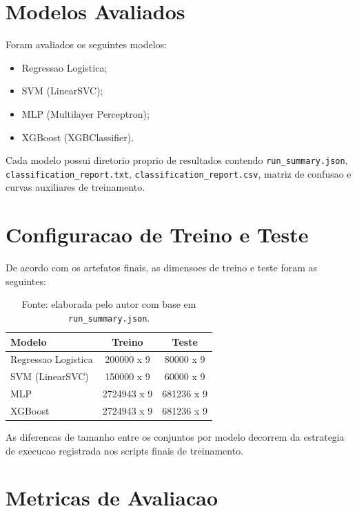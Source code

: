 \section{Modelos Avaliados}

Foram avaliados os seguintes modelos:

\begin{itemize}
  \item Regressao Logistica;
  \item SVM (LinearSVC);
  \item MLP (Multilayer Perceptron);
  \item XGBoost (XGBClassifier).
\end{itemize}

Cada modelo possui diretorio proprio de resultados contendo \texttt{run\_summary.json}, \texttt{classification\_report.txt}, \texttt{classification\_report.csv}, matriz de confusao e curvas auxiliares de treinamento.

\section{Configuracao de Treino e Teste}

De acordo com os artefatos finais, as dimensoes de treino e teste foram as seguintes:

\begin{table}[H]
\centering
\caption{Configuracao dos conjuntos de treino e teste por modelo}
\begin{tabular}{|l|c|c|}
\hline
\textbf{Modelo} & \textbf{Treino} & \textbf{Teste} \\
\hline
Regressao Logistica & 200000 x 9 & 80000 x 9 \\
SVM (LinearSVC) & 150000 x 9 & 60000 x 9 \\
MLP & 2724943 x 9 & 681236 x 9 \\
XGBoost & 2724943 x 9 & 681236 x 9 \\
\hline
\end{tabular}
\label{tab:split_modelos}
\caption*{Fonte: elaborada pelo autor com base em \texttt{run\_summary.json}.}
\end{table}

As diferencas de tamanho entre os conjuntos por modelo decorrem da estrategia de execucao registrada nos scripts finais de treinamento.

\section{Metricas de Avaliacao}

